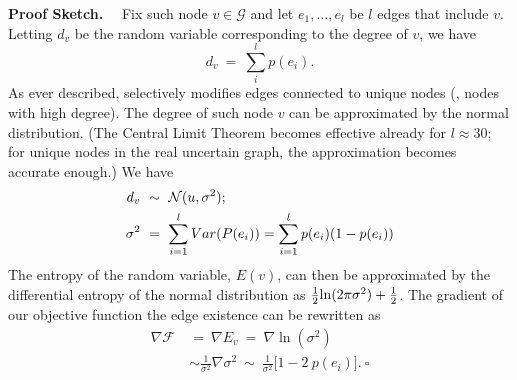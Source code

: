 \textbf{Proof Sketch.}~~
Fix such node $v \in \mathcal{G}$ and let $e_{1},\ldots, e_{l}$ be $l$ edges that include $v$. 
Letting $d_{v}$ be the random variable corresponding to the degree of $v$, 
we have 
\begin{equation*}
  d_{v} ~=~ \sum_{i}^{l} p(e_{i}). 
\end{equation*}
As ever described, {\methodName} selectively modifies edges connected to unique nodes ({\ie}, nodes with high degree).
The degree of such node $v$ can be approximated by the normal distribution. (The Central Limit Theorem becomes effective already for $l\approx 30$; for unique nodes in the real uncertain graph, the approximation becomes accurate enough.) We have
\vspace{-5pt}
\begin{align*}
   d_{v}~&\sim~\mathcal{N}(u, \sigma^2); \\
   \sigma^{2}~&=~\sum_{i=1}^{l} Var(P(e_{i}))=\sum_{i=1}^{l} p(e_{i}) (1-p(e_{i}))
   \vspace{-15pt}
\end{align*}
The entropy of the random variable, $E(v)$, can then be approximated by the differential entropy of the normal distribution as ${{1}\over{2}}{\ln (2\pi\sigma^2)}+ {{1}\over{2}}$. 
The gradient of our objective function {\wrt} the edge existence  can be rewritten as
\begin{align*} 
  \nabla \mathcal{F}~&=~\nabla E_{v}~=~\nabla \ln(\sigma^2) \\
                    ~&\sim \frac{1}{\sigma^2} \nabla \sigma^{2}~\sim~\frac{1}{\sigma^2} \big [ 1-2~p(e_{i}) \big].~\square
\end{align*}